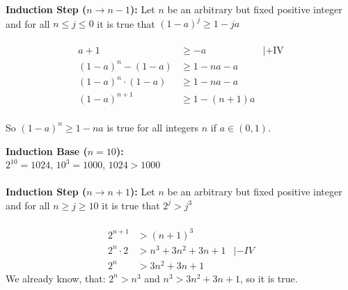 \textbf{Induction Step ($n \rightarrow n-1$):} Let $n$ be an arbitrary but fixed positive integer and for all $n \leq j \leq 0$ it is true that $(1-a)^j \geq 1-ja$ \\ \\

\begin{align*}
    a+1                   & \geq -a       & | + \text{IV} \\
    (1-a)^{n} - (1-a)     & \geq 1-na-a                   \\
    (1-a)^{n} \cdot (1-a) & \geq 1-na-a                   \\
    (1-a)^{n+1}           & \geq 1-(n+1)a                 \\
\end{align*}


So $(1-a)^n \geq 1-na$ is true for all integers $n$ if $a \in (0,1)$.

\textbf{Induction Base ($n=10$):} \\
$2^10 = 1024$, $10^3 = 1000$, $1024 > 1000$ \\ \\

\textbf{Induction Step ($n \rightarrow n+1$):} Let $n$ be an arbitrary but fixed positive integer and for all $n \geq j \geq 10$ it is true that $2^j > j^3$ \\ \\
\begin{align*}
    2^{n+1}     & > (n+1)^3                   \\
    2^n \cdot 2 & > n^3+ 3n^2 + 3n +1 & |- IV \\
    2^n         & > 3n^2 +3n + 1
\end{align*}
We already know, that: $2^n > n^3$ and $n^3 > 3n^2 +3n+1$, so it is true.



